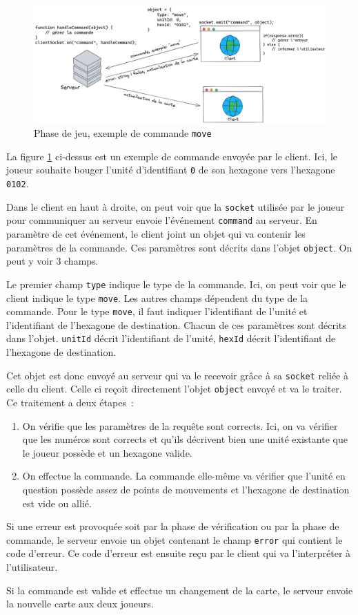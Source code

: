\begin{figure}[H]
    \centering
    \includegraphics[scale=0.25]{data/reseau_commande.png}
    \caption{Phase de jeu, exemple de commande {\tt move}}
    \label{reseau_commande}
\end{figure}

La figure \ref{reseau_commande} ci-dessus est un exemple de commande envoyée par le client.
Ici, le joueur souhaite bouger l'unité d'identifiant {\tt 0} de son hexagone vers l'hexagone {\tt 0102}.

Dans le client en haut à droite, on peut voir que la {\tt socket} utilisée par le joueur pour communiquer au serveur
envoie l'événement {\tt command} au serveur. En paramètre de cet événement, le client joint un objet qui va contenir les
paramètres de la commande. Ces paramètres sont décrits dans l'objet {\tt object}. On peut y voir 3 champs.

Le premier champ {\tt type} indique le type de la commande. Ici, on peut voir que le client indique le type {\tt move}.
Les autres champs dépendent du type de la commande. Pour le type {\tt move}, il faut indiquer l'identifiant de l'unité et
l'identifiant de l'hexagone de destination.
Chacun de ces paramètres sont décrits dans l'objet. {\tt unitId} décrit l'identifiant de l'unité, {\tt hexId} décrit l'identifiant
de l'hexagone de destination.

Cet objet est donc envoyé au serveur qui va le recevoir grâce à sa {\tt socket} reliée à celle du client.
Celle ci reçoit directement l'objet {\tt object} envoyé et va le traiter.
Ce traitement a deux étapes :
\begin{enumerate}
    \item On vérifie que les paramètres de la requête sont corrects. Ici, on va vérifier que les numéros sont corrects
          et qu'ils décrivent bien une unité existante que le joueur possède et un hexagone valide.
    \item On effectue la commande. La commande elle-même va vérifier que l'unité en question possède assez de points de mouvements et l'hexagone de destination est vide ou allié.
\end{enumerate}


Si une erreur est provoquée soit par la phase de vérification ou par la phase de commande, le serveur envoie un objet contenant le champ {\tt error} qui contient le code d'erreur.
Ce code d'erreur est ensuite reçu par le client qui va l'interpréter à l'utilisateur.

Si la commande est valide et effectue un changement de la carte, le serveur envoie la nouvelle carte aux deux joueurs.
